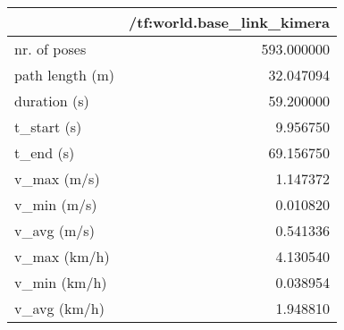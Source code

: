 \begin{tabular}{lr}
\toprule
{} &  /tf:world.base\_link\_kimera \\
\midrule
nr. of poses    &                  593.000000 \\
path length (m) &                   32.047094 \\
duration (s)    &                   59.200000 \\
t\_start (s)     &                    9.956750 \\
t\_end (s)       &                   69.156750 \\
v\_max (m/s)     &                    1.147372 \\
v\_min (m/s)     &                    0.010820 \\
v\_avg (m/s)     &                    0.541336 \\
v\_max (km/h)    &                    4.130540 \\
v\_min (km/h)    &                    0.038954 \\
v\_avg (km/h)    &                    1.948810 \\
\bottomrule
\end{tabular}
